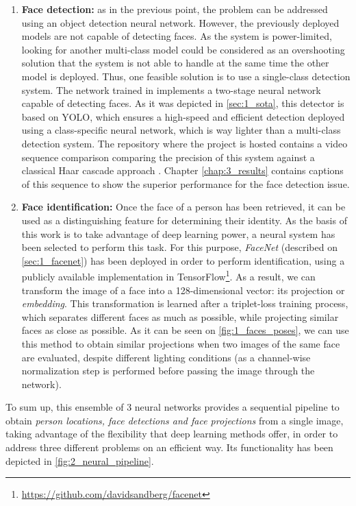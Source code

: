 \begin{enumerate}
	\item \textbf{Face detection:} as in the previous point, the problem can be addressed using an object detection neural network. However, the previously deployed models are not capable of detecting faces. As the system is power-limited, looking for another multi-class model could be considered as an overshooting solution that the system is not able to handle at the same time the other model is deployed. Thus, one feasible solution is to use a single-class detection system. The network trained in \cite{faced} implements a two-stage neural network capable of detecting faces. As it was depicted in \autoref{sec:1_sota}, this detector is based on YOLO, which ensures a high-speed and efficient detection deployed using a class-specific neural network, which is way lighter than a multi-class detection system. The repository where the project is hosted contains a video sequence comparison comparing the precision of this system against a classical Haar cascade approach \cite{violajones}.  Chapter \ref{chap:3_results} contains captions of this sequence to show the superior performance for the face detection issue.
	
	\item \textbf{Face identification:} Once the face of a person has been retrieved, it can be used as a distinguishing feature for determining their identity. As the basis of this work is to take advantage of deep learning power, a neural system has been selected to perform this task. For this purpose, \textit{FaceNet} (described on \autoref{sec:1_facenet}) has been deployed in order to perform identification, using a publicly available implementation in TensorFlow\footnote{\url{https://github.com/davidsandberg/facenet}}. As a result, we can transform the image of a face into a 128-dimensional vector: its projection or \textit{embedding}. This transformation is learned after a triplet-loss training process, which separates different faces as much as possible, while projecting similar faces as close as possible. As it can be seen on \autoref{fig:1_faces_poses}, we can use this method to obtain similar projections when two images of the same face are evaluated, despite different lighting conditions (as a channel-wise normalization step is performed before passing the image through the network).
	
\end{enumerate}

To sum up, this ensemble of 3 neural networks provides a sequential pipeline to obtain \textit{person locations, face detections and face projections} from a single image, taking advantage of the flexibility that deep learning methods offer, in order to address three different problems on an efficient way. Its functionality has been depicted in \autoref{fig:2_neural_pipeline}.\\


